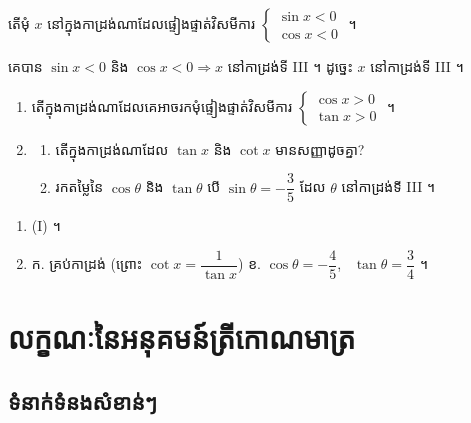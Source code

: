 \begin{example}[លំហាត់គំរូ ៥]
តើមុំ $x$ នៅក្នុងកាដ្រង់ណាដែលផ្ទៀងផ្ទាត់វិសមីការ $\begin{cases} \sin x < 0\\ \cos x < 0 \end{cases}$ ។
\end{example}
\ans
គេបាន $\sin x < 0$ និង $\cos x < 0 \Rightarrow x$ នៅកាដ្រង់ទី III ។ ដូច្នេះ $x$ នៅកាដ្រង់ទី III ។

\begin{pro}
\begin{enumerate}[1]
  \item តើក្នុងកាដ្រង់ណាដែលគេអាចរកមុំផ្ទៀងផ្ទាត់វិសមីការ $\begin{cases} \cos x > 0\\ \tan x > 0 \end{cases}$ ។
  \item
  \begin{enumerate}[a]
    \item តើក្នុងកាដ្រង់ណាដែល $\tan x$ និង $\cot x$ មានសញ្ញាដូចគ្នា?
    \item រកតម្លៃនៃ $\cos\theta$ និង $\tan\theta$ បើ $\sin\theta = -\dfrac{3}{5}$ ដែល $\theta$ នៅកាដ្រង់ទី III ។
  \end{enumerate}
\end{enumerate}
\ans
\begin{enumerate}[1]
  \item (I) ។
  \item ក. គ្រប់កាដ្រង់ (ព្រោះ $\cot x = \dfrac{1}{\tan x}$) \qquad ខ. $\cos\theta = -\dfrac{4}{5}$, \ $\tan\theta = \dfrac{3}{4}$ ។
\end{enumerate}
\end{pro}

\section{លក្ខណៈនៃអនុគមន៍ត្រីកោណមាត្រ}

\subsection{ទំនាក់ទំនងសំខាន់ៗ}

